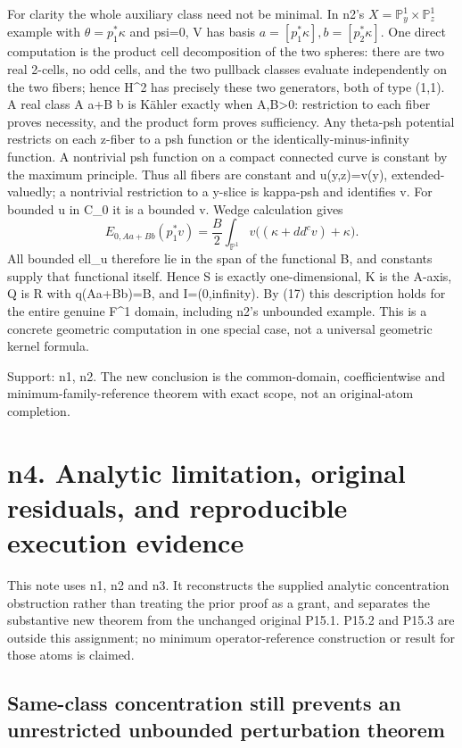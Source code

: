 \documentclass[
]{article}
\begin{document}
For clarity the whole auxiliary class need not be minimal. In n2's
\(X=\mathbb{P}^1_y\times\mathbb{P}^1_z\) example with
\(\theta=p_1^*\kappa\) and psi=0, V has basis
\(a=[p_1^*\kappa],b=[p_2^*\kappa]\). One direct computation is the
product cell decomposition of the two spheres: there are two real
2-cells, no odd cells, and the two pullback classes evaluate
independently on the two fibers; hence H\^{}2 has precisely these two
generators, both of type (1,1). A real class A a+B b is Kähler exactly
when A,B\textgreater0: restriction to each fiber proves necessity, and
the product form proves sufficiency. Any theta-psh potential restricts
on each z-fiber to a psh function or the identically-minus-infinity
function. A nontrivial psh function on a compact connected curve is
constant by the maximum principle. Thus all fibers are constant and
u(y,z)=v(y), extended-valuedly; a nontrivial restriction to a y-slice is
kappa-psh and identifies v. For bounded u in C\_0 it is a bounded v.
Wedge calculation gives \[
E_{0,Aa+Bb}(p_1^*v)=\frac B2\int_{\mathbb{P}^1}v\big((\kappa+dd^cv)+\kappa\big).
\] All bounded ell\_u therefore lie in the span of the functional B, and
constants supply that functional itself. Hence S is exactly
one-dimensional, K is the A-axis, Q is R with q(Aa+Bb)=B, and
I=(0,infinity). By (17) this description holds for the entire genuine
F\^{}1 domain, including n2's unbounded example. This is a concrete
geometric computation in one special case, not a universal geometric
kernel formula.

Support: n1, n2. The new conclusion is the common-domain,
coefficientwise and minimum-family-reference theorem with exact scope,
not an original-atom completion.

\section{n4. Analytic limitation, original residuals, and reproducible
execution
evidence}\label{n4.-analytic-limitation-original-residuals-and-reproducible-execution-evidence}

This note uses n1, n2 and n3. It reconstructs the supplied analytic
concentration obstruction rather than treating the prior proof as a
grant, and separates the substantive new theorem from the unchanged
original P15.1. P15.2 and P15.3 are outside this assignment; no minimum
operator-reference construction or result for those atoms is claimed.

\subsection{Same-class concentration still prevents an unrestricted
unbounded perturbation
theorem}\label{same-class-concentration-still-prevents-an-unrestricted-unbounded-perturbation-theorem}
\end{document}
